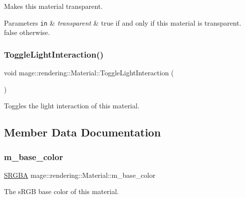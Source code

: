 Makes this material transparent.


\begin{DoxyParams}[1]{Parameters}
\mbox{\tt in}  & {\em transparent} & {\ttfamily true} if and only if this material is transparent. {\ttfamily false} otherwise. \\
\hline
\end{DoxyParams}
\hypertarget{classmage_1_1rendering_1_1_material_a70db3a2d474a3545e573cb9fdfa11347}{}\label{classmage_1_1rendering_1_1_material_a70db3a2d474a3545e573cb9fdfa11347} 
\subsubsection{\texorpdfstring{Toggle\+Light\+Interaction()}{ToggleLightInteraction()}}
{\footnotesize\ttfamily void mage\+::rendering\+::\+Material\+::\+Toggle\+Light\+Interaction (\begin{DoxyParamCaption}{ }\end{DoxyParamCaption})\hspace{0.3cm}{\ttfamily [noexcept]}}

Toggles the light interaction of this material. 

\subsection{Member Data Documentation}
\hypertarget{classmage_1_1rendering_1_1_material_ad51c1da4673a012737ffa9feb14b3565}{}\label{classmage_1_1rendering_1_1_material_ad51c1da4673a012737ffa9feb14b3565} 
\subsubsection{\texorpdfstring{m\+\_\+base\+\_\+color}{m\_base\_color}}
{\footnotesize\ttfamily \hyperlink{structmage_1_1_s_r_g_b_a}{S\+R\+G\+BA} mage\+::rendering\+::\+Material\+::m\+\_\+base\+\_\+color\hspace{0.3cm}{\ttfamily [private]}}

The s\+R\+GB base color of this material. \hypertarget{classmage_1_1rendering_1_1_material_aaee7a296b1f966a1544a07d21e13b8f6}{}\label{classmage_1_1rendering_1_1_material_aaee7a296b1f966a1544a07d21e13b8f6} 
